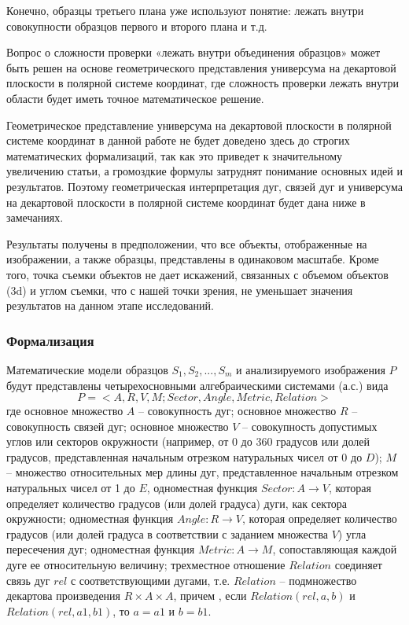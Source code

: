 Конечно,  образцы третьего плана уже используют понятие: лежать внутри  совокупности образцов первого и второго плана и т.д.

Вопрос о сложности проверки «лежать внутри объединения образцов» может быть решен на основе геометрического представления универсума на декартовой плоскости в полярной системе координат, где сложность проверки лежать внутри области будет иметь точное математическое решение.

Геометрическое представление универсума на декартовой плоскости в полярной системе координат в данной работе не будет доведено здесь до строгих математических формализаций, так как это приведет к значительному увеличению статьи, а громоздкие формулы затруднят понимание основных идей и результатов. Поэтому геометрическая интерпретация дуг, связей дуг и универсума на декартовой плоскости в полярной системе координат будет дана ниже в замечаниях.

Результаты получены в предположении, что все объекты, отображенные  на изображении, а также образцы, представлены в одинаковом масштабе. Кроме того, точка съемки объектов не дает искажений, связанных с объемом объектов (3d) и углом съемки, что с нашей точки зрения, не уменьшает значения результатов на данном этапе исследований.

\subsubsection{Формализация}

Математические модели образцов $S_1, S_2, ..., S_m$  и анализируемого изображения $P$ будут представлены четырехосновными алгебраическими системами (а.с.) \cite{D10,D6} вида
\begin{equation}
P = < A, R, V, M; Sector,  Angle, Metric, Relation >
\label{overlaps:1}
\end{equation}
где  основное множество $A$ -- совокупность дуг; основное множество $R$ -- совокупность связей дуг; основное множество $V$ -- совокупность допустимых углов или  секторов окружности  (например, от 0 до 360 градусов или долей градусов, представленная  начальным  отрезком  натуральных чисел от 0 до $D$); $M$ -- множество относительных мер длины дуг, представленное  начальным отрезком натуральных чисел от 1 до $E$, одноместная функция $Sector: A \to V$, которая определяет количество градусов (или долей градуса) дуги,  как сектора окружности; одноместная функция  $Angle: R \to V$, которая  определяет количество градусов (или  долей градуса в соответствии с заданием множества $V$) угла пересечения дуг; одноместная функция  $Metric : A \to M$, сопоставляющая каждой дуге ее относительную величину; трехместное отношение $Relation$ соединяет связь дуг $rel$ с соответствующими дугами, т.е. $Relation$ -- подмножество декартова произведения  $R \times A \times A$, причем , если $Relation(rel , a, b)$  и $Relation(rel , a1, b1)$,  то $a = a1$  и  $b = b1$.

